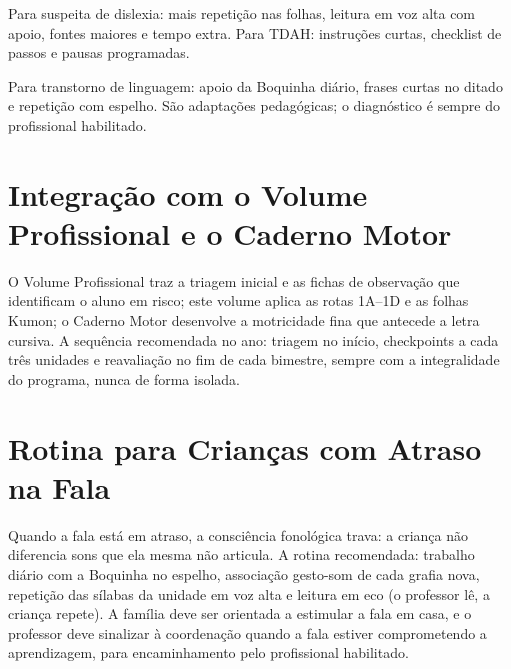 Para suspeita de dislexia: mais repetição nas folhas, leitura em voz alta com apoio, fontes maiores e tempo extra. Para TDAH: instruções curtas, checklist de passos e pausas programadas.


Para transtorno de linguagem: apoio da Boquinha diário, frases curtas no ditado e repetição com espelho. São adaptações pedagógicas; o diagnóstico é sempre do profissional habilitado.


\chapter{Integração com o Volume Profissional e o Caderno Motor}

O Volume Profissional traz a triagem inicial e as fichas de observação que identificam o aluno em risco; este volume aplica as rotas 1A–1D e as folhas Kumon; o Caderno Motor desenvolve a motricidade fina que antecede a letra cursiva. A sequência recomendada no ano: triagem no início, checkpoints a cada três unidades e reavaliação no fim de cada bimestre, sempre com a integralidade do programa, nunca de forma isolada.


\chapter{Rotina para Crianças com Atraso na Fala}

Quando a fala está em atraso, a consciência fonológica trava: a criança não diferencia sons que ela mesma não articula. A rotina recomendada: trabalho diário com a Boquinha no espelho, associação gesto-som de cada grafia nova, repetição das sílabas da unidade em voz alta e leitura em eco (o professor lê, a criança repete). A família deve ser orientada a estimular a fala em casa, e o professor deve sinalizar à coordenação quando a fala estiver comprometendo a aprendizagem, para encaminhamento pelo profissional habilitado.

